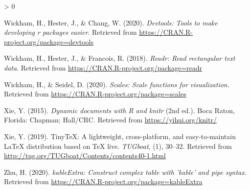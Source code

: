 \documentclass[
  english,
  man, fleqn, noextraspace]{apa6}
\newlength{\cslhangindent}
\newenvironment{CSLReferences}[2] %
 {%
  \setlength{\parindent}{0pt}
  \ifodd #1 \everypar{\setlength{\hangindent}{\cslhangindent}}\ignorespaces\fi
  \ifnum #2 > 0
  \setlength{\parskip}{#2\baselineskip}
  \fi
 }%
 {}
\begin{document}
\begin{CSLReferences}{1}{0}
\leavevmode\hypertarget{ref-R-devtools}{}%
Wickham, H., Hester, J., \& Chang, W. (2020). \emph{Devtools: Tools to make developing r packages easier}. Retrieved from \url{https://CRAN.R-project.org/package=devtools}

\leavevmode\hypertarget{ref-R-readr}{}%
Wickham, H., Hester, J., \& Francois, R. (2018). \emph{Readr: Read rectangular text data}. Retrieved from \url{https://CRAN.R-project.org/package=readr}

\leavevmode\hypertarget{ref-R-scales}{}%
Wickham, H., \& Seidel, D. (2020). \emph{Scales: Scale functions for visualization}. Retrieved from \url{https://CRAN.R-project.org/package=scales}

\leavevmode\hypertarget{ref-R-knitr}{}%
Xie, Y. (2015). \emph{Dynamic documents with {R} and knitr} (2nd ed.). Boca Raton, Florida: Chapman; Hall/CRC. Retrieved from \url{https://yihui.org/knitr/}

\leavevmode\hypertarget{ref-R-tinytex}{}%
Xie, Y. (2019). TinyTeX: A lightweight, cross-platform, and easy-to-maintain LaTeX distribution based on TeX live. \emph{TUGboat}, (1), 30--32. Retrieved from \url{http://tug.org/TUGboat/Contents/contents40-1.html}

\leavevmode\hypertarget{ref-R-kableExtra}{}%
Zhu, H. (2020). \emph{kableExtra: Construct complex table with 'kable' and pipe syntax}. Retrieved from \url{https://CRAN.R-project.org/package=kableExtra}

\end{CSLReferences}

\endgroup
\end{document}
